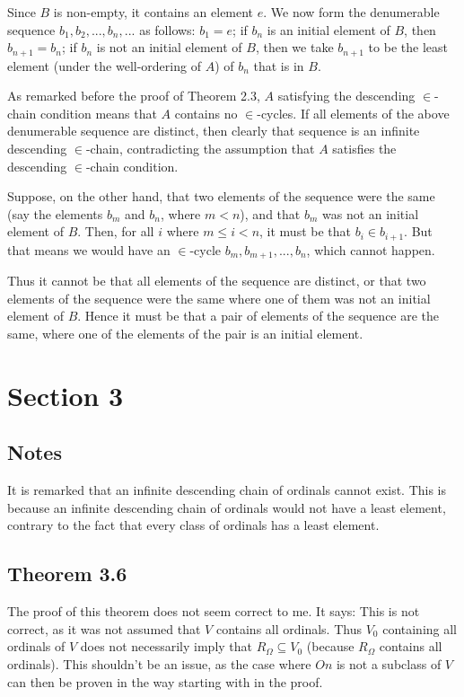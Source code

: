 \documentclass{article}
\theoremstyle{definition}
\begin{document}
Since $B$ is non-empty, it contains an element $e$. We now form the denumerable sequence 
$b_1,b_2,...,b_n,...$ as follows: $b_1=e$; if $b_n$ is an initial element of $B$, then 
$b_{n+1}=b_n$; if $b_n$ is not an initial element of $B$, then we take $b_{n+1}$ to be the least element (under the well-ordering of $A$) of 
$b_n$ that is in $B$.

As remarked before the proof of Theorem 2.3, $A$ satisfying the descending $\in$-chain condition means that 
$A$ contains no $\in$-cycles. If all elements of the above 
denumerable sequence are distinct, then clearly that sequence is an infinite descending $\in$-chain, contradicting the assumption that 
$A$ satisfies the descending $\in$-chain condition. 

Suppose, on the other hand, that two elements of the sequence were the same 
(say the elements $b_m$ and $b_n$, where $m<n$), and that $b_m$ was not an initial element of $B$. Then, for all $i$ where $m\le i<n$, 
it must be that $b_i\in b_{i+1}$. But that means we would have an $\in$-cycle $b_m,b_{m+1},...,b_n$, which cannot happen. 

Thus it cannot be that all elements of the sequence are distinct, or that two elements of the sequence were the same where one of them 
was not an initial element of $B$. Hence it must be that a pair of elements of the sequence are the same, where one of the elements of the 
pair is an initial element.

\section*{Section 3}

\subsection*{Notes}
It is remarked that an infinite descending chain of ordinals cannot exist. This is because an infinite descending chain of ordinals 
would not have a least element, contrary to the fact that every class of ordinals has a least element.

\subsection*{Theorem 3.6}
The proof of this theorem does not seem correct to me. It says:  This is not correct, as it was not assumed that $V$ contains all ordinals. Thus 
$V_0$ containing all ordinals of $V$ does not necessarily imply that $R_\Omega\subseteq V_0$ (because $R_\Omega$ contains all 
ordinals). This shouldn't be an issue, as the case where $On$ is not a subclass of $V$ can then be proven in the way starting with 
 in the proof.
\end{document}
